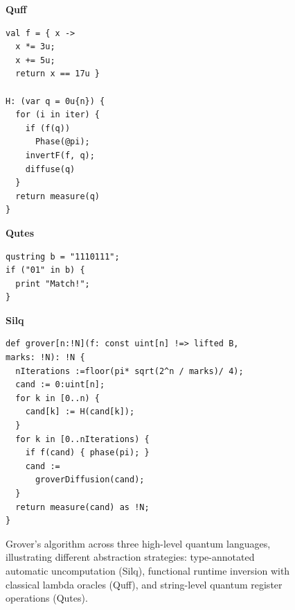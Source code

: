 \begin{figure}[htbp]
    \centering
    \begin{minipage}[t]{0.48\textwidth}
        \textbf{Quff}~\cite{wright2024quff}
        \begin{lstlisting}[basicstyle=\scriptsize\ttfamily,
            frame=single, xleftmargin=2pt, xrightmargin=2pt, label={lst:lit_rev:qpl:grover_comparison:quff}]
val f = { x ->
  x *= 3u;
  x += 5u;
  return x == 17u }

H: (var q = 0u{n}) {
  for (i in iter) {
    if (f(q))
      Phase(@pi);
    invertF(f, q);
    diffuse(q)
  }
  return measure(q)
}
        \end{lstlisting}
    \end{minipage}
    \hfill
    \begin{minipage}[t]{0.48\textwidth}
        \textbf{Qutes}~\cite{faro2025qutes}
        \begin{lstlisting}[basicstyle=\scriptsize\ttfamily,
            frame=single, xleftmargin=2pt, xrightmargin=2pt, label={lst:lit_rev:qpl:grover_comparison:qutes}]
qustring b = "1110111";
if ("01" in b) {
  print "Match!";
}
        \end{lstlisting}
    \end{minipage}
    \vspace{1em}
    \begin{minipage}[t]{0.8\textwidth}
        \textbf{Silq}~\cite{bichsel2020silq,bezganovic2024silq}
        \begin{lstlisting}[basicstyle=\scriptsize\ttfamily,
            frame=single, xleftmargin=2pt, xrightmargin=2pt, label={lst:lit_rev:qpl:grover_comparison:silq}]
def grover[n:!N](f: const uint[n] !=> lifted B,
marks: !N): !N {
  nIterations :=floor(pi* sqrt(2^n / marks)/ 4);
  cand := 0:uint[n];
  for k in [0..n) {
    cand[k] := H(cand[k]);
  }
  for k in [0..nIterations) {
    if f(cand) { phase(pi); }
    cand :=
      groverDiffusion(cand);
  }
  return measure(cand) as !N;
}
        \end{lstlisting}
    \end{minipage}
    \caption{Grover's algorithm across three high-level quantum languages, illustrating
    different abstraction strategies: type-annotated automatic uncomputation (Silq),
        functional runtime inversion with classical lambda oracles (Quff), and string-level
        quantum register operations (Qutes).}
    \label{fig:lit_rev:qpl:grover_comparison}
\end{figure}

